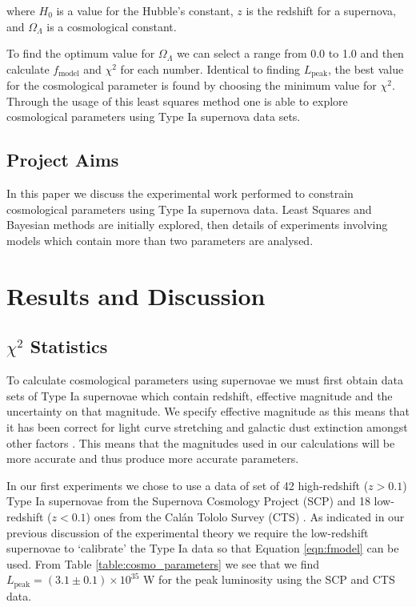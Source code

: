 \documentclass[twocolumn]{revtex4}
\begin{document}
where $H_0$ is a value for the Hubble's constant, $z$ is the redshift for a supernova, and $\Omega_\Lambda$ is a cosmological constant.

To find the optimum value for $\Omega_\Lambda$ we can select a range from 0.0 to 1.0 and then calculate $f_\text{model}$ and $\chi^2$ for each number. Identical to finding $L_\text{peak}$, the best value for the cosmological parameter is found by choosing the minimum value for $\chi^2$. Through the usage of this least squares method one is able to explore cosmological parameters using Type Ia supernova data sets.

\vspace{-4ex}
\subsection{Project Aims}
\vspace{-2ex}
In this paper we discuss the experimental work performed to constrain cosmological parameters using Type Ia supernova data. Least Squares and Bayesian methods are initially explored, then details of experiments involving models which contain more than two parameters are analysed.

\vspace{-3ex}
\section{Results and Discussion} 
\label{sec:results_discussion}
\vspace{-3ex}
\subsection{$\chi^2$ Statistics} 
\vspace{-2ex}
To calculate cosmological parameters using supernovae we must first obtain data sets of Type Ia supernovae which contain redshift, effective magnitude and the uncertainty on that magnitude. We specify effective magnitude as this means that it has been correct for light curve stretching and galactic dust extinction amongst other factors \cite{script}. This means that the magnitudes used in our calculations will be more accurate and thus produce more accurate parameters. 

In our first experiments we chose to use a data of set of 42 high-redshift ($z>0.1$) Type Ia supernovae from the Supernova Cosmology Project (SCP) and 18 low-redshift ($z<0.1$) ones from the Cal\'{a}n Tololo Survey (CTS) \cite{dataset_1}. As indicated in our previous discussion of the experimental theory we require the low-redshift supernovae to `calibrate' the Type Ia data so that Equation \ref{eqn:fmodel} can be used. From Table \ref{table:cosmo_parameters} we see that we find $L_{\text{peak}} = (3.1\pm0.1) \times 10^{35}$ W for the peak luminosity using the SCP and CTS data.
\end{document}
